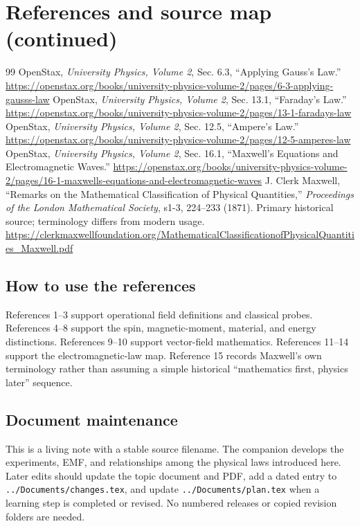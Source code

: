 \documentclass[11pt,letterpaper]{article}
\begin{document}
\section*{References and source map (continued)}
\begingroup\small
\raggedright
\begin{thebibliography}{99}\setcounter{enumiv}{10}
 OpenStax, \emph{University Physics, Volume 2}, Sec. 6.3, ``Applying Gauss's Law.''
\url{https://openstax.org/books/university-physics-volume-2/pages/6-3-applying-gausss-law}
 OpenStax, \emph{University Physics, Volume 2}, Sec. 13.1, ``Faraday's Law.''
\url{https://openstax.org/books/university-physics-volume-2/pages/13-1-faradays-law}
 OpenStax, \emph{University Physics, Volume 2}, Sec. 12.5, ``Ampere's Law.''
\url{https://openstax.org/books/university-physics-volume-2/pages/12-5-amperes-law}
 OpenStax, \emph{University Physics, Volume 2}, Sec. 16.1, ``Maxwell's Equations and Electromagnetic Waves.''
\url{https://openstax.org/books/university-physics-volume-2/pages/16-1-maxwells-equations-and-electromagnetic-waves}
 J. Clerk Maxwell, ``Remarks on the Mathematical Classification of Physical Quantities,'' \emph{Proceedings of the London Mathematical Society}, s1-3, 224--233 (1871). Primary historical source; terminology differs from modern usage.
\url{https://clerkmaxwellfoundation.org/MathematicalClassificationofPhysicalQuantities_Maxwell.pdf}
\end{thebibliography}
\endgroup

\subsection*{How to use the references}
References 1--3 support operational field definitions and classical probes. References 4--8 support the spin, magnetic-moment, material, and energy distinctions. References 9--10 support vector-field mathematics. References 11--14 support the electromagnetic-law map. Reference 15 records Maxwell's own terminology rather than assuming a simple historical ``mathematics first, physics later'' sequence.

\subsection*{Document maintenance}
This is a living note with a stable source filename. The companion  develops the experiments, EMF, and relationships among the physical laws introduced here. Later edits should update the topic document and PDF, add a dated entry to \texttt{../Documents/changes.tex}, and update \texttt{../Documents/plan.tex} when a learning step is completed or revised. No numbered releases or copied revision folders are needed.
\end{document}
